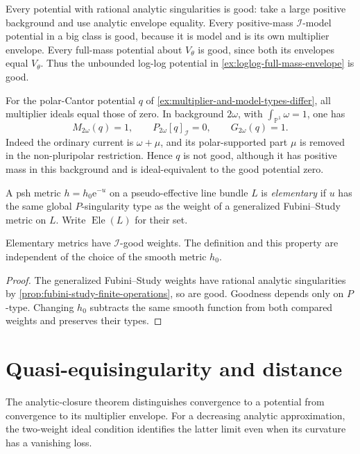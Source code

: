\begin{example}\label{ex:i-good-basic-types-and-mass-gap}
Every potential with rational analytic singularities is good: take a large positive background and use analytic envelope equality. Every positive-mass $\mathcal I$-model potential in a big class is good, because it is model and is its own multiplier envelope. Every full-mass potential about $V_\theta$ is good, since both its envelopes equal $V_\theta$. Thus the unbounded log-log potential in \cref{ex:loglog-full-mass-envelope} is good.

For the polar-Cantor potential $q$ of \cref{ex:multiplier-and-model-types-differ}, all multiplier ideals equal those of zero. In background $2\omega$, with $\int_{\mathbb P^1}\omega=1$, one has
\[
 M_{2\omega}(q)=1,\qquad
 P_{2\omega}[q]_{\mathcal I}=0,\qquad G_{2\omega}(q)=1.
\]
Indeed the ordinary current is $\omega+\mu$, and its polar-supported part $\mu$ is removed in the non-pluripolar restriction. Hence $q$ is not good, although it has positive mass in this background and is ideal-equivalent to the good potential zero.
\end{example}

\begin{definition}\label{def:elementary-psh-metric}
A psh metric $h=h_0\mathrm e^{-u}$ on a pseudo-effective line bundle $L$ is \emph{elementary} if $u$ has the same global $P$-singularity type as the weight of a generalized Fubini--Study metric on $L$. Write $\operatorname{Ele}(L)$ for their set.
\end{definition}

\begin{corollary}\label{cor:elementary-metrics-i-good}
Elementary metrics have $\mathcal I$-good weights. The definition and this property are independent of the choice of the smooth metric $h_0$.
\end{corollary}
\begin{proof}
The generalized Fubini--Study weights have rational analytic singularities by \cref{prop:fubini-study-finite-operations}, so are good. Goodness depends only on $P$-type. Changing $h_0$ subtracts the same smooth function from both compared weights and preserves their types.
\end{proof}

\section{Quasi-equisingularity and distance}
\label{sec:quasi-equisingular-distance}
The analytic-closure theorem distinguishes convergence to a potential from convergence to its multiplier envelope. For a decreasing analytic approximation, the two-weight ideal condition identifies the latter limit even when its curvature has a vanishing loss.

